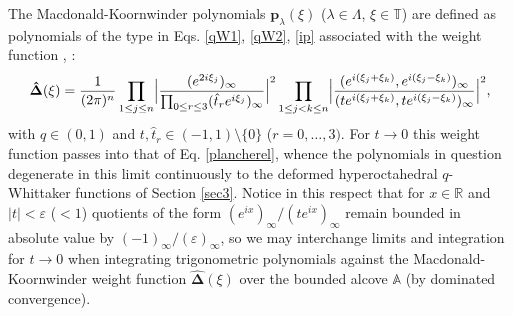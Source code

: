 \documentclass[reqno]{amsart}
\theoremstyle{remark}
\numberwithin{equation}{section}
\begin{document}
The Macdonald-Koornwinder polynomials  $\mathbf{p}_{\lambda} (\xi)$ ($\lambda\in\Lambda$, $\xi \in \mathbb{T}$)  are defined as polynomials of the type in Eqs. \eqref{qW1}, \eqref{qW2}, \eqref{ip}  associated with the weight function \cite[~5]{koo:askey-wilson},  \cite[~5.3]{mac:affine}:
\begin{equation*}\label{MKweight}
\boldsymbol{\hat{\Delta}} (\xi )=\frac{1}{(2\pi)^n}
\prod_{1\leq j\leq n}\Bigl|
\frac{(e^{2i\xi_j})_\infty}{\prod_{0\leq r\leq 3} (\hat{t}_re^{i\xi_j})_\infty}  \Bigr|^2 
\prod_{1\leq j<k\leq n}\Bigl| 
\frac{(e^{i(\xi_j+\xi_k)},e^{i(\xi_j-\xi_k)})_\infty}{(te^{i(\xi_j+\xi_k)},te^{i(\xi_j-\xi_k)})_\infty}\Bigr|^2
,
\end{equation*}
with $q\in (0,1)$ and $t,\hat{t}_r\in (-1,1)\setminus \{0\}$ ($r=0,\ldots ,3)$.
For $t\to 0$ this weight function passes into that of Eq. \eqref{plancherel}, whence the polynomials in question degenerate in this limit continuously to the deformed hyperoctahedral $q$-Whittaker functions of Section \ref{sec3}.
Notice in this respect that for $x\in\mathbb{R}$ and $| t | <\varepsilon$ ($<1$) quotients of the form
$(e^{ix})_\infty/ (te^{ix})_\infty$ remain bounded in absolute value by $(-1)_\infty/(\varepsilon)_\infty$, so  we may interchange limits and integration for $t\to 0$ when integrating trigonometric polynomials against the Macdonald-Koornwinder weight function $\boldsymbol{\hat{\Delta}} (\xi )$ over the bounded alcove $\mathbb{A}$ (by dominated convergence). 
\end{document}
